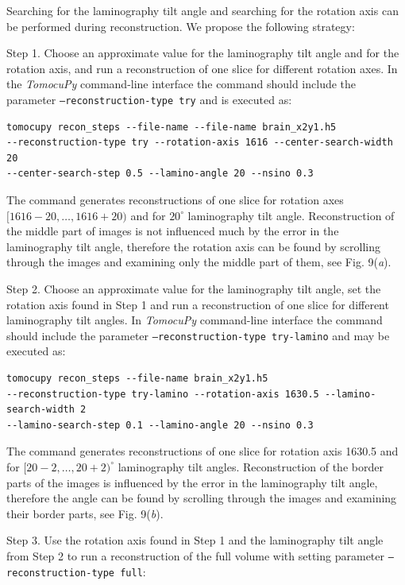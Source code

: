 \documentclass{article}
\begin{document}
Searching for the laminography tilt angle and searching for the rotation axis can be performed during reconstruction. We propose the following strategy:

Step 1. Choose an approximate value for the laminography tilt angle and for the rotation axis, and run a reconstruction of one slice for different rotation axes. In the \emph{TomocuPy} command-line interface the command should include the parameter \texttt{--reconstruction-type try} and is executed as:

\begin{verbatim}
tomocupy recon_steps --file-name --file-name brain_x2y1.h5
--reconstruction-type try --rotation-axis 1616 --center-search-width 20
--center-search-step 0.5 --lamino-angle 20 --nsino 0.3
\end{verbatim}

The command generates reconstructions of one slice for rotation axes $[1616 - 20, \dots, 1616 + 20)$ and for $20^\circ$ laminography tilt angle. Reconstruction of the middle part of images is not influenced much by the error in the laminography tilt angle, therefore the rotation axis can be found by scrolling through the images and examining only the middle part of them, see Fig. 9(\emph{a}).

Step 2. Choose an approximate value for the laminography tilt angle, set the rotation axis found in Step 1 and run a reconstruction of one slice for different laminography tilt angles. In \emph{TomocuPy} command-line interface the command should include the parameter \texttt{--reconstruction-type try-lamino} and may be executed as:

\begin{verbatim}
tomocupy recon_steps --file-name brain_x2y1.h5
--reconstruction-type try-lamino --rotation-axis 1630.5 --lamino-search-width 2
--lamino-search-step 0.1 --lamino-angle 20 --nsino 0.3
\end{verbatim}

The command generates reconstructions of one slice for rotation axis 1630.5 and for $[20 - 2, \dots, 20 + 2)^\circ$ laminography tilt angles. Reconstruction of the border parts of the images is influenced by the error in the laminography tilt angle, therefore the angle can be found by scrolling through the images and examining their border parts, see Fig. 9(\emph{b}).

Step 3. Use the rotation axis found in Step 1 and the laminography tilt angle from Step 2 to run a reconstruction of the full volume with setting parameter \texttt{--reconstruction-type full}:
\end{document}
